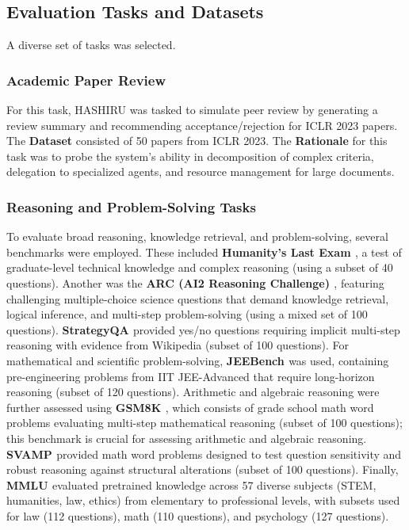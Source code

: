 \documentclass[twocolumn]{article}
\begin{document}
\subsection{Evaluation Tasks and Datasets}
\label{subsec:tech_tasks}
A diverse set of tasks was selected.
\subsubsection{Academic Paper Review}
For this task, HASHIRU was tasked to simulate peer review by generating a review summary and recommending acceptance/rejection for ICLR 2023 papers. The \textbf{Dataset} consisted of 50 papers from ICLR 2023. The \textbf{Rationale} for this task was to probe the system's ability in decomposition of complex criteria, delegation to specialized agents, and resource management for large documents.

\subsubsection{Reasoning and Problem-Solving Tasks}
To evaluate broad reasoning, knowledge retrieval, and problem-solving, several benchmarks were employed. These included \textbf{Humanity's Last Exam \cite{phan2025humanitysexam}}, a test of graduate-level technical knowledge and complex reasoning (using a subset of 40 questions). Another was the \textbf{ARC (AI2 Reasoning Challenge) \cite{boratko2018systematic}}, featuring challenging multiple-choice science questions that demand knowledge retrieval, logical inference, and multi-step problem-solving (using a mixed set of 100 questions). \textbf{StrategyQA \cite{geva2021strategyqa}} provided yes/no questions requiring implicit multi-step reasoning with evidence from Wikipedia (subset of 100 questions). For mathematical and scientific problem-solving, \textbf{JEEBench \cite{arora-etal-2023-llms}} was used, containing pre-engineering problems from IIT JEE-Advanced that require long-horizon reasoning (subset of 120 questions). Arithmetic and algebraic reasoning were further assessed using \textbf{GSM8K \cite{cobbe2021gsm8k}}, which consists of grade school math word problems evaluating multi-step mathematical reasoning (subset of 100 questions); this benchmark is crucial for assessing arithmetic and algebraic reasoning. \textbf{SVAMP \cite{patel2021nlp, patel2021svamp}} provided math word problems designed to test question sensitivity and robust reasoning against structural alterations (subset of 100 questions). Finally, \textbf{MMLU \cite{hendrycks2021measuringmassivemultitasklanguage}} evaluated pretrained knowledge across 57 diverse subjects (STEM, humanities, law, ethics) from elementary to professional levels, with subsets used for law (112 questions), math (110 questions), and psychology (127 questions).
\end{document}

